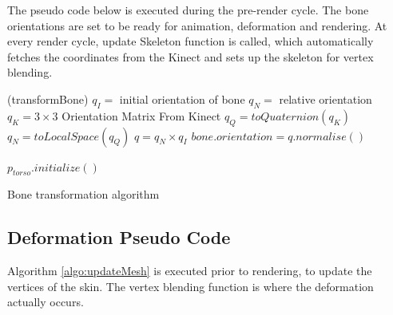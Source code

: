 The pseudo code below is executed during the pre-render cycle. The bone
orientations are set to be ready for animation, deformation and rendering. At
every render cycle, update Skeleton function is called, which automatically
fetches the coordinates from the Kinect and sets up the skeleton for vertex
blending. 

\begin{algorithm}
\dontprintsemicolon %
\function(transformBone){
$q_I =$ initial orientation of bone\;
$q_N =$ relative orientation\;
$q_K = 3\times3$ Orientation Matrix From Kinect\;
 {
  $q_Q = toQuaternion(q_K)$\;
  $q_N = toLocalSpace(q_Q)$\;
  $q = q_N \times q_I$\;
  $bone.orientation=q.normalise{\left(\right)}$\; }}

 {
  $p_{torso}.initialize()$  \;
 }
\caption{Bone transformation algorithm}
\label{algo:transformBone}
\end{algorithm}

\subsection{Deformation Pseudo Code}

Algorithm \ref{algo:updateMesh} is executed prior to rendering, to update the
vertices of the skin. The vertex blending function is where the deformation
actually occurs.

